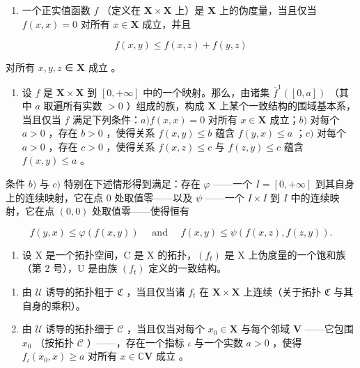 \ExerciseSection

\begin{enumerate}
\def\labelenumi{\arabic{enumi})}
\tightlist
\item
  一个正实值函数 \(f\) （定义在 \(\mathbf{X} \times \mathbf{X}\) 上）是 \(\mathbf{X}\) 上的伪度量，当且仅当 \(f(x, x) = 0\) 对所有 \(x \in \mathbf{X}\) 成立，并且
\end{enumerate}

\[
f (x, y) \leqslant f (x, z) + f (y, z)
\]

对所有 \(x, y, z\) ∈ \(\mathbf{X}\) 成立 。

\begin{enumerate}
\def\labelenumi{\arabic{enumi})}
\setcounter{enumi}{1}
\tightlist
\item
  设 \(f\) 是 \(\mathbf{X} \times \mathbf{X}\) 到 \([0, +\infty]\) 中的一个映射。那么，由诸集 \(\overline{f}^{1}([0, a])\) （其中 \(a\) 取遍所有实数 \(>0\) ）组成的族，构成 \(\mathbf{X}\) 上某个一致结构的围域基本系，当且仅当 \(f\) 满足下列条件：\(a) f(x, x) = 0\) 对所有 \(x \in \mathbf{X}\) 成立；\(b)\) 对每个 \(a > 0\) ，存在 \(b > 0\) ，使得关系 \(f(x, y) \leqslant b\) 蕴含 \(f(y, x) \leqslant a\) ；\(c)\) 对每个 \(a > 0\) ，存在 \(c > 0\) ，使得关系 \(f(x, z) \leqslant c\) 与 \(f(z, y) \leqslant c\) 蕴含 \(f(x, y) \leqslant a\) 。
\end{enumerate}

条件 \(b)\) 与 \(c)\) 特别在下述情形得到满足：存在 \(\varphi\) ——一个 \(I = [0, +\infty]\) 到其自身上的连续映射，它在点 \(0\) 处取值零——以及 \(\psi\) ——一个 \(I \times I\) 到 \(I\) 中的连续映射，它在点 \((0, 0)\) 处取值零——使得恒有

\[
f (y, x) \leqslant \varphi (f (x, y)) \quad \text { and } \quad f (x, y) \leqslant \psi (f (x, z), f (z, y)).
\]

\begin{enumerate}
\def\labelenumi{\arabic{enumi})}
\setcounter{enumi}{2}
\tightlist
\item
  设 X 是一个拓扑空间，C 是 X 的拓扑，\((f_{t})\) 是 X 上伪度量的一个饱和族（第 2 号），U 是由族 \((f_{t})\) 定义的一致结构。
\end{enumerate}

\begin{enumerate}
\def\labelenumi{\alph{enumi})}
\item
  由 \(\mathcal{U}\) 诱导的拓扑粗于 \(\mathfrak{C}\) ，当且仅当诸 \(f_{t}\) 在 \(\mathbf{X} \times \mathbf{X}\) 上连续（关于拓扑 \(\mathfrak{C}\) 与其自身的乘积）。
\item
  由 \(\mathcal{U}\) 诱导的拓扑细于 \(\mathcal{C}\) ，当且仅当对每个 \(x_0 \in \mathbf{X}\) 与每个邻域 \(\mathbf{V}\) ——它包围 \(x_0\) （按拓扑 \(\mathcal{C}\) ）——，存在一个指标 \(\iota\) 与一个实数 \(a > 0\) ，使得 \(f_{\iota}(x_0, x) \geqslant a\) 对所有 \(x \in \mathbb{C}\mathbf{V}\) 成立 。
\end{enumerate}

